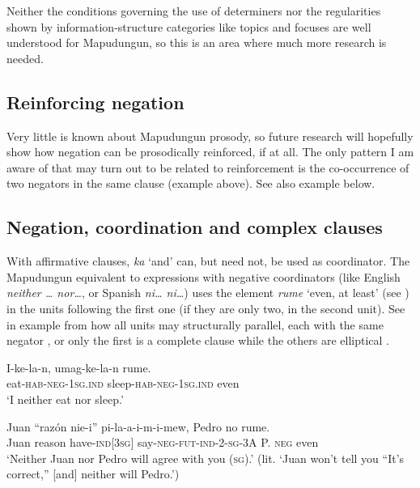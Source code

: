 \documentclass[output=paper,colorlinks,citecolor=brown,draft]{langscibook}
\begin{document}
Neither the conditions governing the use of determiners nor the regularities shown by information-structure categories like topics and focuses are well understood for Mapudungun, so this is an area where much more research is needed.

\subsection{Reinforcing negation}

Very little is known about Mapudungun prosody, so future research will hopefully show how negation can be prosodically reinforced, if at all. The only pattern I am aware of that may turn out to be related to reinforcement is the co-occurrence of two negators in the same clause (example  above). See also example  below. 

\subsection{Negation, coordination and complex clauses}
\label{sec:mapu:4.5}

With affirmative clauses, \textit{ka} ‘and’ can, but need not, be used as coordinator. The Mapudungun equivalent to expressions with negative coordinators (like English \textit{neither … nor…}, or Spanish \textit{ni… ni…}) uses the element \textit{rume} ‘even, at least’ (see ) in the units following the first one (if they are only two, in the second unit). See in example  from \citet[253]{Augusta1916} how all units may structurally parallel, each with the same negator , or only the first is a complete clause while the others are elliptical .

\ea\label{ex:mapu:27}
    
    \ea\label{ex:mapu:27a}
        \gll I-ke-la-n,      umag-ke-la-n rume. \\ 
             eat-\textsc{hab-neg-1sg.ind} sleep\textsc{{}-hab-neg-1sg.ind} even \\
        \glt ‘I neither eat nor sleep.’
    
    \ex\label{ex:mapu:27b}
        \gll Juan  “razón  nie-i”  pi-la-a-i-m-i-mew, Pedro    no  rume.\\
             Juan  reason    have-\textsc{ind[3sg]} say-\textsc{neg-fut-ind-2-sg-3A} P. \textsc{neg} even\\
        \glt ‘Neither Juan nor Pedro will agree with you (\textsc{sg}).’ (lit. ‘Juan won’t tell you “It’s correct,” [and] neither will Pedro.’)
    
\end{document}

